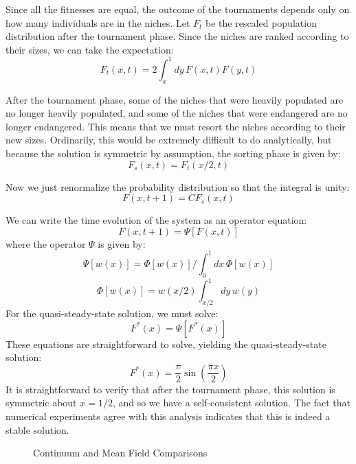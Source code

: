 Since all the fitnesses are equal, the outcome of the tournaments depends
only on how many individuals are in the niches.  Let $F_t$ be the
rescaled population distribution after the tournament phase.  Since
the niches are ranked according to their sizes, we can take the expectation:
\begin{equation}
F_t(x,t)=2\int_x^1{dy\,F(x,t) F(y,t)}
\end{equation}

After the tournament phase, some of the niches that were heavily
populated are no longer heavily populated, and some of the niches that
were endangered are no longer endangered.  This means that we must resort
the niches according to their new sizes.  Ordinarily, this would be
extremely difficult to do analytically, but
because the solution is symmetric by assumption, the sorting phase is
given by:
\begin{equation}
F_{s}(x,t)=F_t(x/2,t)
\end{equation}

Now we just renormalize the probability distribution so that the integral
is unity:
\begin{equation}
F(x,t+1)=C F_s(x,t)
\end{equation}

We can write the time evolution of the system as an operator equation:
\begin{equation}
F(x,t+1)=\Psi[F(x,t)]
\end{equation}
where the operator $\Psi$ is given by:
\begin{equation}
\Psi[w(x)]=\Phi[w(x)]/\int_0^1{dx\, \Phi[w(x)]}
\end{equation}
\begin{equation}
\Phi[w(x)]=w(x/2)\int_{x/2}^1{dy\,w(y)}
\end{equation}
For the quasi-steady-state solution, we must solve:
\begin{equation}
F^*(x)=\Psi[F^*(x)]
\end{equation}
These equations are straightforward to solve, yielding the quasi-steady-state
solution:
\begin{equation}
F^*(x)=\frac{\pi}{2}\sin(\frac{\pi x}{2})
\end{equation}
It is straightforward to verify that after the tournament phase, this
solution is symmetric about $x=1/2$, and so we have a self-consistent
solution.  The fact that numerical experiments agree with this analysis
indicates that this is indeed a stable solution.

\begin{figure}
\caption{Continuum and Mean Field Comparisons}
\end{figure}

